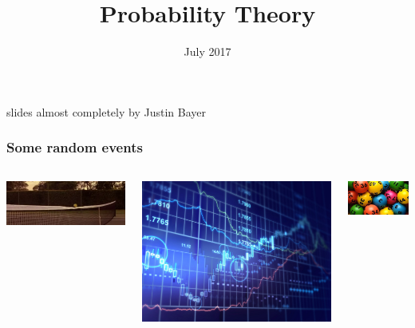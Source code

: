 \documentclass[USenglish,pdftex,compress,10pt,svgnamesi,handout]{beamer}
\title{Probability Theory}
\date{July 2017}
\begin{document}
\begin{frame}
	\titlepage
	
	slides almost completely by Justin Bayer

\end{frame}

\begin{frame}
\frametitle{Some random events}
\begin{columns}[t]
\column{5cm}

\includegraphics[width=\linewidth]{pics/matchpoint}

\vspace{1em}

\includegraphics[width=\linewidth]{pics/stocks}

\column{5cm}

\includegraphics[width=\linewidth]{pics/lotto}


\end{columns}
\end{frame}
\end{document}
